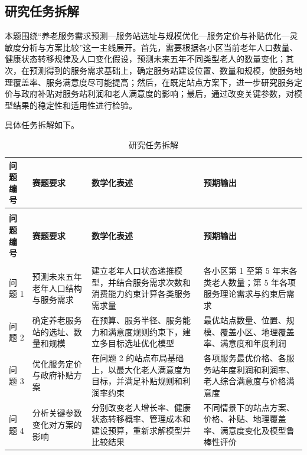 \documentclass[UTF8]{ctexart}
\begin{document}
\subsection{研究任务拆解}

本题围绕“养老服务需求预测—服务站选址与规模优化—服务定价与补贴优化—灵敏度分析与方案比较”这一主线展开。首先，需要根据各小区当前老年人口数量、健康状态转移规律及人口变化假设，预测未来五年不同类型老人的数量变化；其次，在预测得到的服务需求基础上，确定服务站建设位置、数量和规模，使服务地理覆盖率、服务满意度尽可能提高；然后，在既定站点方案下，进一步研究服务定价与政府补贴对服务站利润和老人满意度的影响；最后，通过改变关键参数，对模型结果的稳定性和适用性进行检验。

具体任务拆解如下。

\begin{longtable}{|>{\centering\arraybackslash}p{1.5cm}|>{\centering\arraybackslash}p{3.2cm}|>{\centering\arraybackslash}p{4.5cm}|>{\centering\arraybackslash}p{4.5cm}|}
\caption{研究任务拆解\label{tab:tasks}} \\
\hline
\textbf{问题编号} & \textbf{赛题要求} & \textbf{数学化表述} & \textbf{预期输出} \\
\hline
\endfirsthead

\multicolumn{4}{c}{续表 \ref{tab:tasks}} \\
\hline
\textbf{问题编号} & \textbf{赛题要求} & \textbf{数学化表述} & \textbf{预期输出} \\
\hline
\endhead

\hline
\multicolumn{4}{r}{{续下页}} \\
\endfoot

\hline
\endlastfoot

问题 1 & 预测未来五年老年人口结构与服务需求 & 建立老年人口状态递推模型，并结合服务需求次数和消费能力约束计算各类服务需求量 & 各小区第 1 至第 5 年末各类老人数量；第 5 年各项服务理论需求与约束后需求 \\
\hline
问题 2 & 确定养老服务站的选址、数量和规模 & 在预算、服务半径、服务能力和满意度规则约束下，建立多目标选址优化模型 & 最优站点数量、位置、规模、覆盖小区、地理覆盖率、满意度和年度利润 \\
\hline
问题 3 & 优化服务定价与政府补贴方案 & 在问题 2 的站点布局基础上，以最大化老人满意度为目标，并满足补贴规则和利润率约束 & 各项服务最优价格、各服务站年度利润和利润率、老人综合满意度与价格满意度 \\
\hline
问题 4 & 分析关键参数变化对方案的影响 & 分别改变老人增长率、健康状态转移概率、管理成本和建设预算，重新求解模型并比较结果 & 不同情景下的站点方案、价格、补贴、地理覆盖率、满意度变化及模型鲁棒性评价 \\
\hline
\end{longtable}
\end{document}
